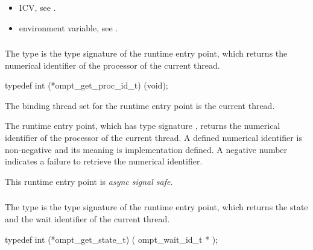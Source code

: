 \crossreferences
\begin{itemize}
\item {} ICV, see
.

\item {} environment variable, see
.
\end{itemize}



\subsubsection{}
\label{sec:ompt_get_proc_id_t}
\label{sec:ompt_get_proc_id}

\summary
The  type is the type signature of the 
 runtime entry point, which returns the
numerical identifier of the processor of the current thread.

\format
\begin{ccppspecific}
\begin{omptInquiry}
typedef int (*ompt_get_proc_id_t) (void);
\end{omptInquiry}
\end{ccppspecific}

\binding
The binding thread set for the  runtime entry point
is the current thread.

\descr
The  runtime entry point, which has type signature
, returns the numerical identifier of the processor 
of the current thread. A defined numerical identifier is non-negative and
its meaning is implementation defined. A negative number indicates a failure 
to retrieve the numerical identifier.

This runtime entry point is \emph{async signal safe}.



\subsubsection{}
\label{sec:ompt_get_state_t}
\label{sec:ompt_get_state}

\summary
The  type is the type signature of the 
 runtime entry point, which returns the
state and the wait identifier of the current thread.

\format
\begin{ccppspecific}
\begin{omptInquiry}
typedef int (*ompt_get_state_t) (
  ompt_wait_id_t *
);
\end{omptInquiry}
\end{ccppspecific}

